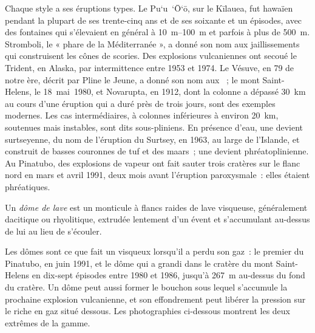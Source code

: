 Chaque style a ses éruptions types. Le Pu`u~`\=O`\=o, sur le Kīlauea, fut hawaïen pendant
la plupart de ses trente-cinq ans et de ses soixante et un épisodes, avec des fontaines qui s'élevaient
en général à \qtyrange{10}{100}{m} et parfois à plus de \qty{500}{m}. Stromboli, le
« phare de la Méditerranée », a donné son nom aux jaillissements qui construisent les
cônes de scories. Des explosions vulcaniennes ont secoué le Trident, en Alaska, par intermittence entre
1953 et 1974. Le Vésuve, en 79 de notre ère, décrit par Pline le Jeune, a donné son nom aux
~; le mont Saint-Helens, le 18~mai~1980, et Novarupta, en 1912, dont
la colonne a dépassé \qty{30}{km} au cours d'une éruption qui a duré près de trois jours, sont
des exemples modernes.
Les cas intermédiaires, à colonnes inférieures à environ \qty{20}{km}, soutenues mais instables,
sont dits sous-pliniens. En présence d'eau, une  devient surtseyenne,
du nom de l'éruption du Surtsey, en 1963, au large de l'Islande, et construit de basses couronnes de
tuf et des maars~; une  devient phréatoplinienne. Au Pinatubo, des explosions de vapeur ont fait sauter
trois cratères sur le flanc nord en mars et avril 1991, deux
mois avant l'éruption paroxysmale~: elles étaient phréatiques.

\begin{definition}\label{def:b2:eruptive-styles:dome}
Un \emph{dôme de lave} est un monticule à flancs raides de lave visqueuse,
généralement dacitique ou rhyolitique, extrudée lentement d'un évent et s'accumulant au-dessus de lui
au lieu de s'écouler.
\end{definition}

Les dômes sont ce que fait un  visqueux lorsqu'il a perdu son gaz~: le premier  du Pinatubo,
en juin 1991, et le dôme qui a grandi dans le cratère du mont Saint-Helens en dix-sept
épisodes entre 1980 et 1986, jusqu'à \qty{267}{m} au-dessus du fond du cratère.
Un dôme peut aussi former le bouchon sous lequel s'accumule la prochaine explosion vulcanienne,
et son effondrement peut libérer la pression sur le  riche en gaz situé dessous. Les
photographies ci-dessous montrent les deux extrêmes de la gamme.

